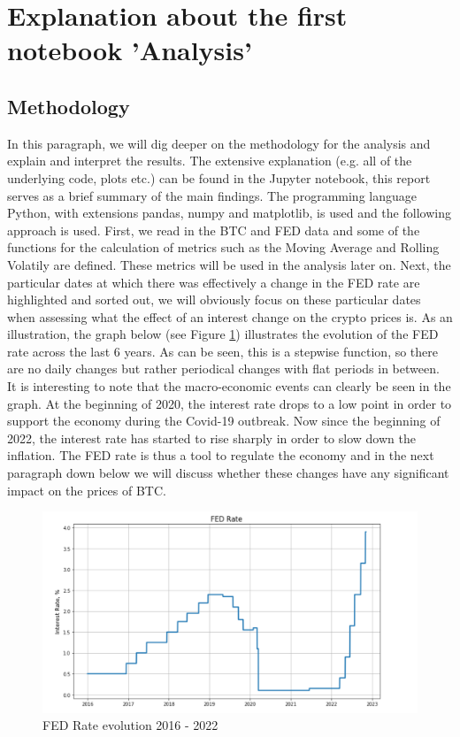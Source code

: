 \documentclass[12pt]{article}
\begin{document}
\section{Explanation about the first notebook 'Analysis'}
\subsection{Methodology}
In this paragraph, we will dig deeper on the methodology for the analysis and explain and interpret the results. The extensive explanation (e.g. all of the underlying code, plots etc.) can be found in the Jupyter notebook, this report serves as a brief summary of the main findings. \newline \newline
The programming language Python, with extensions pandas, numpy and matplotlib, is used and the following approach is used. First, we read in the BTC and FED data and some of the functions for the calculation of metrics such as the Moving Average and Rolling Volatily are defined. These metrics will be used in the analysis later on. Next, the particular dates at which there was effectively a change in the FED rate are highlighted and sorted out, we will obviously focus on these particular dates when assessing what the effect of an interest change on the crypto prices is. \newline
\newline As an illustration, the graph below (see Figure \ref{fig:FED Rate evolution 2016 - 2022}) illustrates the evolution of the FED rate across the last 6 years. As can be seen, this is a stepwise function, so there are no daily changes but rather periodical changes with flat periods in between. \newline It is interesting to note that the macro-economic events can clearly be seen in the graph. At the beginning of 2020, the interest rate drops to a low point in order to support the economy during the Covid-19 outbreak. Now since the beginning of 2022, the interest rate has started to rise sharply in order to slow down the inflation. The FED rate is thus a tool to regulate the economy and in the next paragraph down below we will discuss whether these changes have any significant impact on the prices of BTC.

\begin{figure}[!htb]
   \includegraphics[scale=0.7]{research_project/text/paper/FED rate graph.png}
   \centering
   \caption{FED Rate evolution 2016 - 2022}
   \label{fig:FED Rate evolution 2016 - 2022}
\end{figure}
\end{document}
